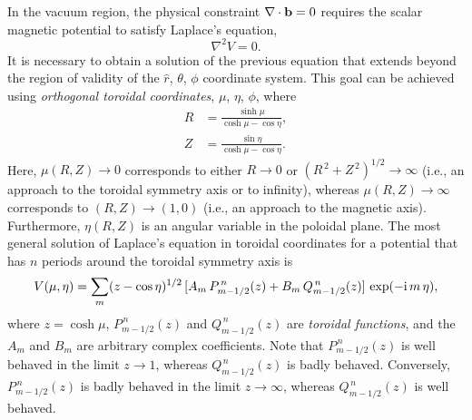\documentclass[12pt,prb,aps]{revtex4-1}
\begin{document}
In the vacuum region, the physical constraint $\nabla\cdot {\bf b} =0$ requires the scalar magnetic potential to satisfy Laplace's equation,
\begin{equation}
\nabla^2 V= 0.
\end{equation}
It is necessary to obtain a solution of the previous equation that extends beyond the region of validity of the
$\hat{r}$, $\theta$, $\phi$ coordinate system. This goal can be achieved using {\em orthogonal toroidal coordinates}, $\mu$, $\eta$, $\phi$, 
where\,\cite{morse}
\begin{align}\label{e54cx}
R &= \frac{\sinh\mu}{\cosh\mu-\cos\eta},\\[0.5ex]
Z&= \frac{\sin\eta}{\cosh\mu-\cos\eta}.\label{e55cc}
\end{align}
Here, $\mu(R,Z)\rightarrow 0$ corresponds to either $R\rightarrow 0$ or $(R^{\,2}+Z^{\,2})^{1/2}\rightarrow\infty$ (i.e.,
an approach to the toroidal symmetry axis or to infinity), whereas $\mu(R,Z)\rightarrow \infty$
corresponds to $(R, Z) \rightarrow (1, 0)$ (i.e., an approach to the magnetic axis). Furthermore, $\eta(R,Z)$ is an angular variable in the poloidal
plane.  The most general solution of Laplace's equation in toroidal coordinates for a potential that has $n$ periods around the
toroidal symmetry axis is\,\cite{morse1}
\begin{equation}
V(\mu,\eta) = \sum_m (z-\cos\eta)^{1/2}\,[A_m\,P_{m-1/2}^{\,n}(z) + B_m\,Q_{m-1/2}^{\,n}(z)]\,\exp(-{\rm i}\,m\,\eta),\label{e233}
\end{equation}
where $z=\cosh\mu$, $P_{m-1/2}^{\,n}(z)$ and $Q_{m-1/2}^{\,n}(z)$ are {\em toroidal functions},\cite{abrama} and the $A_m$ and
$B_m$ are arbitrary complex coefficients.  Note that $P_{m-1/2}^{\,n}(z)$ is well behaved
in the limit $z\rightarrow 1$, whereas $Q_{m-1/2}^{\,n}(z)$ is badly behaved.  Conversely, $P_{m-1/2}^{\,n}(z)$ is badly behaved in the limit
$z\rightarrow\infty$, whereas $Q_{m-1/2}^{\,n}(z)$ is well behaved. 
\end{document}

